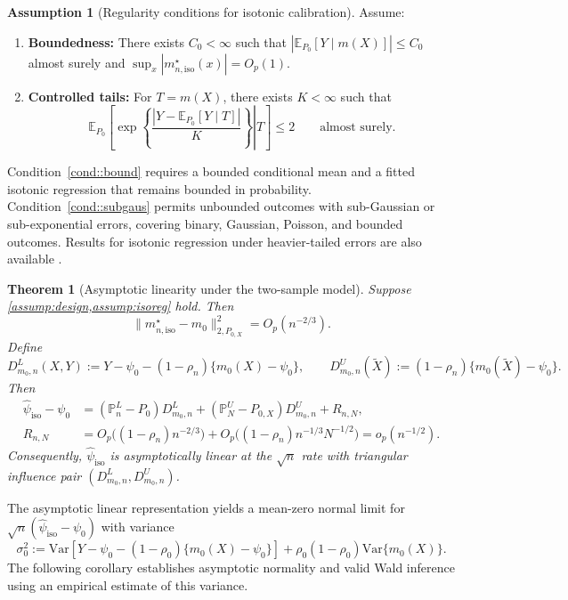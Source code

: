 \documentclass{article}
\theoremstyle{plain}
\newtheorem{theorem}{Theorem}
\theoremstyle{definition}
\newtheorem{assumption}{Assumption}
\newcommand{\E}{\mathbb{E}}
\newcommand{\Var}{\mathrm{Var}}
\newcommand{\1}{\mathbbm{1}}
\newcommand{\mhat}{m}
\newcommand{\rhozero}{\rho_0}
\newcommand{\rhon}{\rho_n}
\newcommand{\Pl}{\mathbb{P}^{L}_n}
\newcommand{\Pu}{\mathbb{P}^{U}_N}
\newcommand{\Px}{P_{0,X}}
\begin{document}
\begin{assumption}[Regularity conditions for isotonic calibration]
\label{assump:isoreg}
Assume:
\begin{enumerate}[leftmargin=6mm,label=(\roman*)]
\item \textbf{Boundedness:} There exists $C_0<\infty$ such that
$|\E_{P_0}[Y \mid \mhat(X)]|\le C_0$ almost surely and
$\sup_x |m_{n,\mathrm{iso}}^\star(x)| = O_p(1)$.
\label{cond::bound}
\item \textbf{Controlled tails:} For \(T=\mhat(X)\), there exists
\(K<\infty\) such that
\[
\E_{P_0}\left[
\left.\exp\left\{\frac{|Y-\E_{P_0}[Y\mid T]|}{K}\right\}\right|T
\right]\le2
\qquad\text{almost surely}.
\]
\label{cond::subgaus}
\end{enumerate}
\end{assumption}

Condition~\ref{cond::bound} requires a bounded conditional
mean and a fitted isotonic regression that remains bounded
in probability. Condition~\ref{cond::subgaus} permits
unbounded outcomes with sub-Gaussian or sub-exponential
errors, covering binary, Gaussian, Poisson, and bounded
outcomes. Results for isotonic regression under heavier-tailed
errors are also available
\citep{han2018robustness,han2019convergence}.

\begin{theorem}[Asymptotic linearity under the two-sample model]
\label{thm:al}
Suppose \cref{assump:design,assump:isoreg} hold. Then
\[
\|m_{n,\mathrm{iso}}^\star-m_0\|_{2,\Px}^2
=
O_p(n^{-2/3}).
\]
Define
\[
D_{m_0,n}^L(X,Y)
:=
Y-\psi_0-(1-\rhon)\{m_0(X)-\psi_0\},
\qquad
D_{m_0,n}^U(\widetilde X)
:=
(1-\rhon)\{m_0(\widetilde X)-\psi_0\}.
\]
Then
\begin{align}
\widehat{\psi}_{\mathrm{iso}}-\psi_0
&=
(\Pl-P_0)D_{m_0,n}^L
+
(\Pu-\Px)D_{m_0,n}^U
+
R_{n,N},
\label{eq:al}\\
R_{n,N}
&=
O_p\bigl((1-\rhon)n^{-2/3}\bigr)
+
O_p\bigl((1-\rhon)n^{-1/3}N^{-1/2}\bigr)
=o_p(n^{-1/2}).
\nonumber
\end{align}
Consequently, $\widehat{\psi}_{\mathrm{iso}}$ is
asymptotically linear at the $\sqrt n$ rate with triangular
influence pair $(D_{m_0,n}^L,D_{m_0,n}^U)$.
\end{theorem}

The asymptotic linear representation yields a mean-zero
normal limit for
$\sqrt n(\widehat{\psi}_{\mathrm{iso}}-\psi_0)$ with variance
\[
\sigma_0^2
:=
\Var\!\left[
Y-\psi_0-(1-\rhozero)\{m_0(X)-\psi_0\}
\right]
+
\rhozero(1-\rhozero)\Var\{m_0(X)\}.
\]
The following corollary establishes asymptotic normality
and valid Wald inference using an empirical estimate of
this variance.
\end{document}
